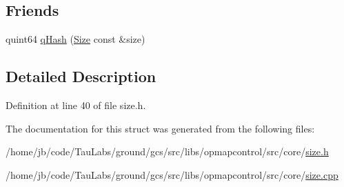 \subsection*{\-Friends}
\begin{DoxyCompactItemize}
\item 
quint64 \hyperlink{group___o_p_map_widget_ga49c2077e2f80e6178a3dfbda52f03e88}{q\-Hash} (\hyperlink{structcore_1_1_size}{\-Size} const \&size)
\end{DoxyCompactItemize}


\subsection{\-Detailed \-Description}


\-Definition at line 40 of file size.\-h.



\-The documentation for this struct was generated from the following files\-:\begin{DoxyCompactItemize}
\item 
/home/jb/code/\-Tau\-Labs/ground/gcs/src/libs/opmapcontrol/src/core/\hyperlink{size_8h}{size.\-h}\item 
/home/jb/code/\-Tau\-Labs/ground/gcs/src/libs/opmapcontrol/src/core/\hyperlink{size_8cpp}{size.\-cpp}\end{DoxyCompactItemize}

